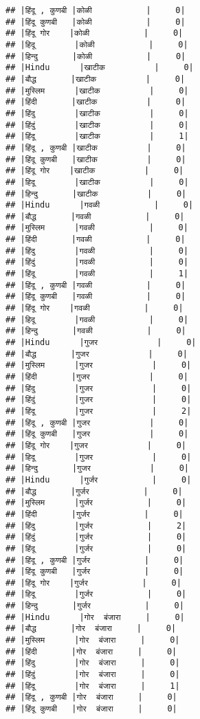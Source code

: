 \documentclass[
]{article}
\begin{document}
\begin{verbatim}
## |हिंदू , कुणबी |कोळी           |     0|
## |हिंदू कुणबी   |कोळी           |     0|
## |हिंदू गोर    |कोळी           |     0|
## |हिदू        |कोळी           |     0|
## |हिन्दु       |कोळी           |     0|
## |Hindu      |खाटीक          |     0|
## |बौद्ध       |खाटीक          |     0|
## |मुस्लिम      |खाटीक          |     0|
## |हिंदी       |खाटीक          |     0|
## |हिंदु        |खाटीक          |     0|
## |हिंदुं        |खाटीक          |     0|
## |हिंदू        |खाटीक          |     1|
## |हिंदू , कुणबी |खाटीक          |     0|
## |हिंदू कुणबी   |खाटीक          |     0|
## |हिंदू गोर    |खाटीक          |     0|
## |हिदू        |खाटीक          |     0|
## |हिन्दु       |खाटीक          |     0|
## |Hindu      |गवळी           |     0|
## |बौद्ध       |गवळी           |     0|
## |मुस्लिम      |गवळी           |     0|
## |हिंदी       |गवळी           |     0|
## |हिंदु        |गवळी           |     0|
## |हिंदुं        |गवळी           |     0|
## |हिंदू        |गवळी           |     1|
## |हिंदू , कुणबी |गवळी           |     0|
## |हिंदू कुणबी   |गवळी           |     0|
## |हिंदू गोर    |गवळी           |     0|
## |हिदू        |गवळी           |     0|
## |हिन्दु       |गवळी           |     0|
## |Hindu      |गुजर            |     0|
## |बौद्ध       |गुजर            |     0|
## |मुस्लिम      |गुजर            |     0|
## |हिंदी       |गुजर            |     0|
## |हिंदु        |गुजर            |     0|
## |हिंदुं        |गुजर            |     0|
## |हिंदू        |गुजर            |     2|
## |हिंदू , कुणबी |गुजर            |     0|
## |हिंदू कुणबी   |गुजर            |     0|
## |हिंदू गोर    |गुजर            |     0|
## |हिदू        |गुजर            |     0|
## |हिन्दु       |गुजर            |     0|
## |Hindu      |गुर्जर           |     0|
## |बौद्ध       |गुर्जर           |     0|
## |मुस्लिम      |गुर्जर           |     0|
## |हिंदी       |गुर्जर           |     0|
## |हिंदु        |गुर्जर           |     2|
## |हिंदुं        |गुर्जर           |     0|
## |हिंदू        |गुर्जर           |     0|
## |हिंदू , कुणबी |गुर्जर           |     0|
## |हिंदू कुणबी   |गुर्जर           |     0|
## |हिंदू गोर    |गुर्जर           |     0|
## |हिदू        |गुर्जर           |     0|
## |हिन्दु       |गुर्जर           |     0|
## |Hindu      |गोर  बंजारा     |     0|
## |बौद्ध       |गोर  बंजारा     |     0|
## |मुस्लिम      |गोर  बंजारा     |     0|
## |हिंदी       |गोर  बंजारा     |     0|
## |हिंदु        |गोर  बंजारा     |     0|
## |हिंदुं        |गोर  बंजारा     |     0|
## |हिंदू        |गोर  बंजारा     |     1|
## |हिंदू , कुणबी |गोर  बंजारा     |     0|
## |हिंदू कुणबी   |गोर  बंजारा     |     0|

\end{verbatim}
\end{document}
